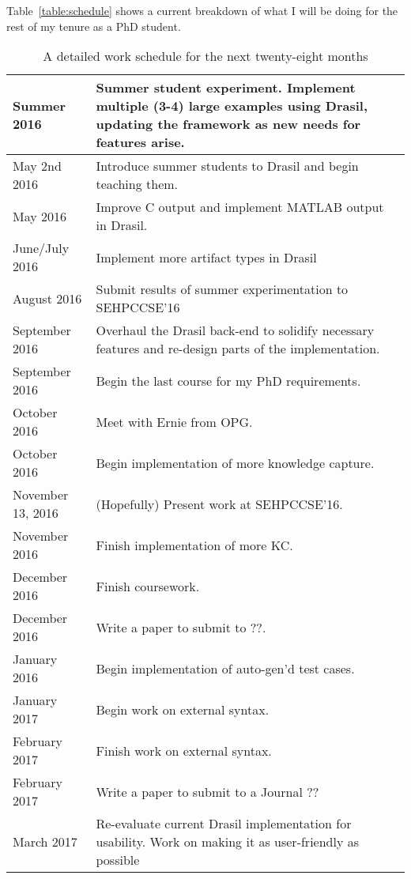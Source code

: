 \documentclass{article}
\begin{document}
Table~\ref{table:schedule} shows a current breakdown of what I will be doing for the rest of my tenure as a PhD student.
\begin{table}
\caption{A detailed work schedule for the next twenty-eight months}
\begin{tabular}{|l|p{}|}
\hline
      Summer 2016 & Summer student experiment.
            Implement multiple (3-4) large examples using Drasil, updating the
              framework as new needs for features arise.\\ \hline

      May 2nd 2016 & Introduce summer students to Drasil and begin teaching them.
\\ \hline
      May 2016 & Improve C output and implement MATLAB output in Drasil.
\\ \hline
      June/July 2016 & Implement more artifact types in Drasil
\\ \hline
      August 2016 & Submit results of summer experimentation to SEHPCCSE'16
\\ \hline
      September 2016 & Overhaul the Drasil back-end to solidify necessary features
                      and re-design parts of the implementation.
\\ \hline
      September 2016 & Begin the last course for my PhD requirements.
\\ \hline
      October 2016 & Meet with Ernie from OPG.
\\ \hline
      October 2016 & Begin implementation of more knowledge capture.
\\ \hline
      November 13, 2016 & (Hopefully) Present work at SEHPCCSE'16.
\\ \hline
      November 2016 & Finish implementation of more KC.
\\ \hline
      December 2016 & Finish coursework.
\\ \hline
      December 2016 & Write a paper to submit to ??.
\\ \hline
      January 2016 & Begin implementation of auto-gen'd test cases.
\\ \hline
      January 2017 & Begin work on external syntax.
\\ \hline
      February 2017 & Finish work on external syntax.
\\ \hline
      February 2017 & Write a paper to submit to a Journal ??
\\ \hline
      March 2017 & Re-evaluate current Drasil implementation for usability. 
        Work on making it as user-friendly as possible

\end{tabular}
\end{table}
\end{document}
